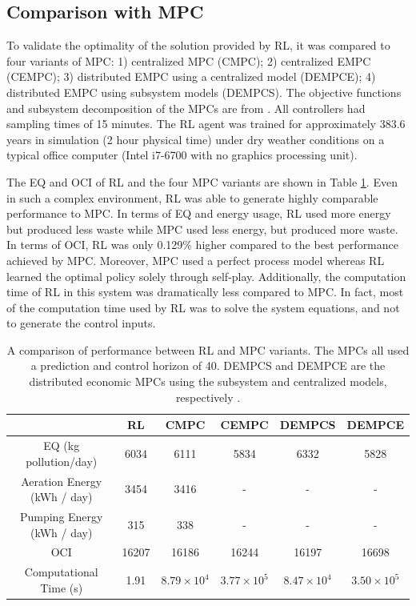 \subsection{Comparison with MPC}
To validate the optimality of the solution provided by RL, it was compared to four variants of MPC: 1) centralized MPC (CMPC); 2) centralized EMPC (CEMPC); 3) distributed EMPC using a centralized model (DEMPCE); 4) distributed EMPC using subsystem models (DEMPCS).  The objective functions and subsystem decomposition of the MPCs are from \cite{an_mpc}. All controllers had sampling times of 15 minutes. The RL agent was trained for approximately 383.6 years in simulation (2 hour physical time) under dry weather conditions on a typical office computer (Intel i7-6700 with no graphics processing unit).

The EQ and OCI of RL and the four MPC variants are shown in Table \ref{tab:04rl_vs_mpcs}.  Even in such a complex environment, RL was able to generate highly comparable performance to MPC. In terms of EQ and energy usage, RL used more energy but produced less waste while MPC used less energy, but produced more waste.  In terms of OCI, RL was only 0.129\% higher compared to the best performance achieved by MPC.  Moreover, MPC used a perfect process model whereas RL learned the optimal policy solely through self-play.  Additionally, the computation time of RL in this system was dramatically less compared to MPC. In fact, most of the computation time used by RL was to solve the system equations, and not to generate the control inputs. 

\begin{table}[H]
\footnotesize
\caption{A comparison of performance between RL and MPC variants. The MPCs all used a prediction and control horizon of 40.  DEMPCS and DEMPCE are the distributed economic MPCs using the subsystem and centralized models, respectively \cite{an_mpc}.}
\centering
\begin{tabular}{c|c|c|c|c|c}
                         &\textbf{RL}     & \textbf{CMPC} & \textbf{CEMPC} & \textbf{DEMPCS} & \textbf{DEMPCE}\\
\hline
EQ (kg pollution/day)  	 &   6034                 & 6111                     &   5834                    &  6332           &	5828	 \\
Aeration Energy (kWh / day) &  3454      &   3416                     &   -       &    -   &	-	 \\
Pumping Energy (kWh / day)  & 315   &   338                     &   -       &   -    &	-	 \\
OCI                       & 16207   &   16186       & 16244         &   16197    &	16698	 \\
Computational Time (s)     &  1.91  &  $8.79 \times 10^4$     &    $3.77 \times 10^5$    &   $8.47 \times 10^4$   &	 $3.50 \times 10^5$	
\label{tab:04rl_vs_mpcs}
\end{tabular}
\end{table}

